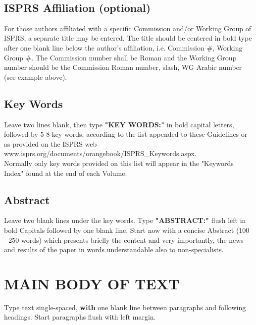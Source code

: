 \documentclass{isprs}
\begin{document}
~ %

\subsection{ISPRS Affiliation (optional)}\label{sec:ISPRS Affiliation (optional)}

For those authors affiliated with a specific Commission and/or Working Group of 
ISPRS, a separate title may be entered. The title should be centered in bold type 
after one blank line below the author’s affiliation, i.e. Commission \#, Working Group \#. 
The Commission number shall be Roman and the Working Group number should be the Commission 
Roman number, slash, WG Arabic number (see example above).


\subsection{Key Words}\label{sec:Key Words}

Leave two lines blank, then type \textbf{"KEY WORDS:"}
in bold capital letters, followed by 5-8 key words, according to the
list appended to these Guidelines or as provided on the ISPRS web
www.isprs.org/documents/orangebook/ISPRS\_Keywords.aspx. \\
Normally only key words provided on this list will appear in the "Keywords Index" found at the end of each Volume. 


\subsection{Abstract}\label{sec:Abstract}

Leave two blank lines under the key words. Type \textbf{"ABSTRACT:"}
flush left in bold Capitals followed by one blank line. Start now
with a concise Abstract (100 - 250 words) which presents briefly the
content and very importantly, the news and results of the paper in
words understandable also to non-specialists. 




\section{MAIN BODY OF TEXT}\label{sec:MAIN BODY OF TEXT}

Type text single-spaced, \textbf{with} one blank line between paragraphs and 
following headings. Start paragraphs flush with left margin.
\end{document}
